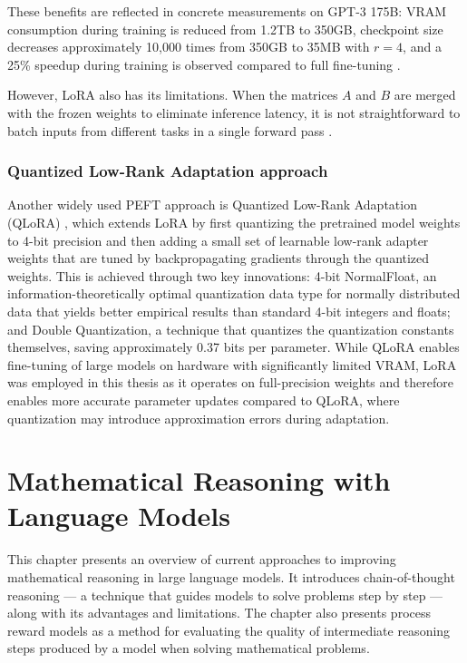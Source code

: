 These benefits are reflected in concrete measurements on
GPT-3 175B: VRAM consumption during training is reduced
from 1.2TB to 350GB, checkpoint size decreases approximately
10{,}000 times from 350GB to 35MB with $r = 4$, and a 25\%
speedup during training is observed compared to full
fine-tuning \cite{hu2022lora}.

However, LoRA also has its limitations. When the matrices $A$ and $B$
are merged with the frozen weights to eliminate inference
latency, it is not straightforward to batch inputs from
different tasks in a single forward pass \cite{hu2022lora}.

\subsection{Quantized Low-Rank Adaptation approach}

Another widely used PEFT approach is Quantized Low-Rank
Adaptation (QLoRA)  \cite{dettmers2023}, which extends LoRA by first quantizing
the pretrained model weights to 4-bit precision and then
adding a small set of learnable low-rank adapter weights
that are tuned by backpropagating gradients through the
quantized weights. This is achieved
through two key innovations: 4-bit NormalFloat, an
information-theoretically optimal quantization data type
for normally distributed data that yields better empirical
results than standard 4-bit integers and floats; and Double
Quantization, a technique that quantizes the quantization
constants themselves, saving approximately 0.37 bits per
parameter. While QLoRA enables
fine-tuning of large models on hardware with significantly
limited VRAM, LoRA was employed in this thesis as it
operates on full-precision weights and therefore enables
more accurate parameter updates compared to QLoRA, where
quantization may introduce approximation errors during
adaptation.

\chapter{Mathematical Reasoning with Language Models}
\label{chap:math-reasoning}
This chapter presents an overview of current
  approaches to improving mathematical reasoning in
  large language models. It introduces chain-of-thought
  reasoning --- a technique that guides models to solve
  problems step by step --- along with its advantages
  and limitations. The chapter also presents process
  reward models as a method for evaluating the quality
  of intermediate reasoning steps produced by a model
  when solving mathematical problems.
